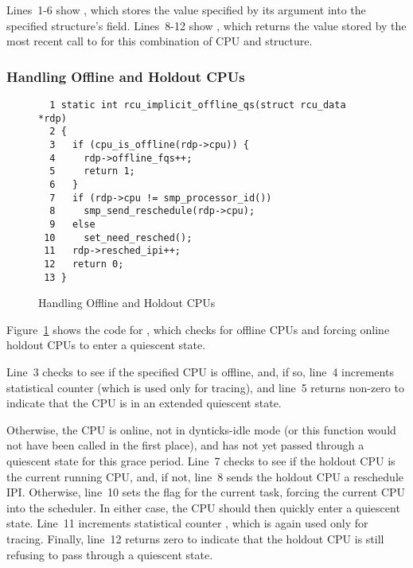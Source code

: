 Lines~1-6 show , which stores the
value specified by its  argument into the specified
 structure's  field.
Lines~8-12 show , which returns
the value stored by the most recent call to
 for this combination of CPU and
 structure.

\subsubsection{Handling Offline and Holdout CPUs}
\label{app:rcuimpl:rcutreewt:Handling Offline and Holdout CPUs}

\begin{figure}[tbp]
{ \scriptsize
\begin{verbatim}
  1 static int rcu_implicit_offline_qs(struct rcu_data *rdp)
  2 {
  3   if (cpu_is_offline(rdp->cpu)) {
  4     rdp->offline_fqs++;
  5     return 1;
  6   }
  7   if (rdp->cpu != smp_processor_id())
  8     smp_send_reschedule(rdp->cpu);
  9   else
 10     set_need_resched();
 11   rdp->resched_ipi++;
 12   return 0;
 13 }
\end{verbatim}
}
\caption{Handling Offline and Holdout CPUs}
\label{fig:app:rcuimpl:rcutreewt:Handling Offline and Holdout CPUs}
\end{figure}

Figure~\ref{fig:app:rcuimpl:rcutreewt:Handling Offline and Holdout CPUs}
shows the code for , which checks for
offline CPUs and forcing online holdout CPUs to enter a quiescent state.

Line~3 checks to see if the specified CPU is offline, and, if so,
line~4 increments statistical counter  (which is
used only for tracing), and line~5 returns non-zero to indicate
that the CPU is in an extended quiescent state.

Otherwise, the CPU is online, not in dynticks-idle mode (or this
function would not have been called in the first place), and has
not yet passed through a quiescent state for this grace period.
Line~7 checks to see if the holdout CPU is the current running
CPU, and, if not, line~8 sends the holdout CPU a reschedule IPI.
Otherwise, line~10 sets the  flag for the
current task, forcing the current CPU into the scheduler.
In either case, the CPU should then quickly enter a quiescent
state.
Line~11 increments statistical counter , which is
again used only for tracing.
Finally, line~12 returns zero to indicate that the holdout CPU is
still refusing to pass through a quiescent state.

